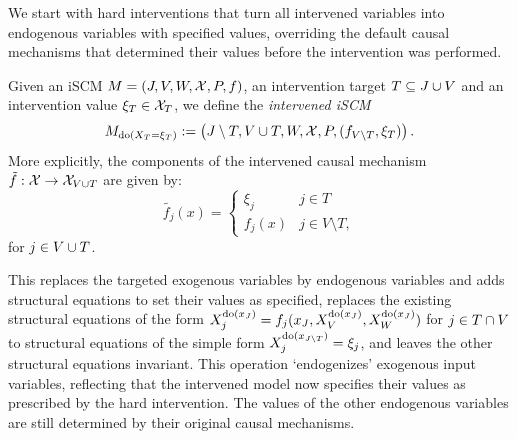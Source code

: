 We start with hard interventions that turn all intervened variables into
endogenous variables with specified values, overriding
the default causal mechanisms that determined their values before the
intervention was performed.
\begin{Def}\label{def:scm_hard_intervention}
  Given an iSCM $M = \left ( J, V, W, \mathcal{X}, P, f \right )$, an intervention target $T \subseteq J \cup V$ %
  and an intervention value $\xi_T \in \mathcal{X}_{T}$, we define the \emph{intervened iSCM}
  $$M_{\operatorname{do}(X_{T}=\xi_T)} := \left ( J\setminus T,V \cup T,W,\mathcal{X},P,(f_{V\setminus T},\xi_T) \right ).$$
  More explicitly, the components of the intervened causal mechanism $\tilde{f} : \mathcal{X} \to \mathcal{X}_{V \cup T}$ are
  given by:
    $$\tilde{f_j}(x) = \begin{cases}
      \xi_j & j \in T \\
        f_j(x) & j \in V \setminus T,
    \end{cases}$$
  for $j \in V \cup T$.
\end{Def}
This replaces the targeted exogenous variables by endogenous variables and adds structural equations
to set their values as specified, replaces the existing structural equations of the form
$X_j^{\operatorname{do}(x_{J})} = f_j(x_{J},X_{V}^{\operatorname{do}(x_{J})},X_{W}^{\operatorname{do}(x_{J})})$ for $j \in T \cap V$ to structural equations of the simple form 
$X_j^{\operatorname{do}(x_{J\setminus T})} = \xi_j$, and leaves the other structural equations invariant.
This operation `endogenizes' exogenous input variables, %
reflecting that the intervened model now specifies their values as prescribed by the hard intervention.
The values of the other endogenous variables are still determined by their original causal mechanisms.

